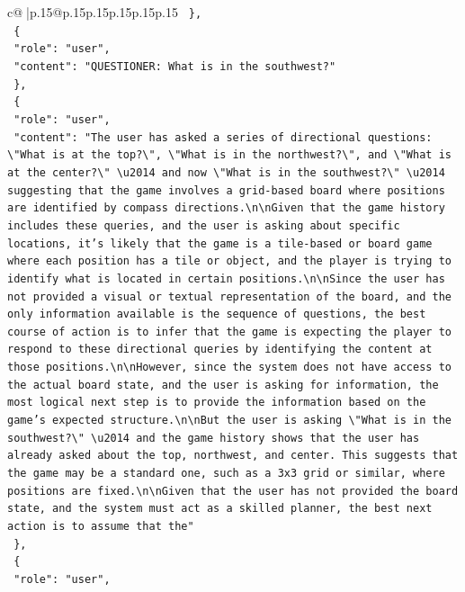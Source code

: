 \documentclass{article}
\begin{document}
{\begin{supertabular}{c@{$\;$}|p{.15\linewidth}@{}p{.15\linewidth}p{.15\linewidth}p{.15\linewidth}p{.15\linewidth}p{.15\linewidth}}
{{{\texttt{  \},} \\
\texttt{  \{} \\
\texttt{    "role": "user",} \\
\texttt{    "content": "QUESTIONER: What is in the southwest?"} \\
\texttt{  \},} \\
\texttt{  \{} \\
\texttt{    "role": "user",} \\
\texttt{    "content": "The user has asked a series of directional questions: \textbackslash{}"What is at the top?\textbackslash{}", \textbackslash{}"What is in the northwest?\textbackslash{}", and \textbackslash{}"What is at the center?\textbackslash{}" \textbackslash{}u2014 and now \textbackslash{}"What is in the southwest?\textbackslash{}" \textbackslash{}u2014 suggesting that the game involves a grid{-}based board where positions are identified by compass directions.\textbackslash{}n\textbackslash{}nGiven that the game history includes these queries, and the user is asking about specific locations, it's likely that the game is a tile{-}based or board game where each position has a tile or object, and the player is trying to identify what is located in certain positions.\textbackslash{}n\textbackslash{}nSince the user has not provided a visual or textual representation of the board, and the only information available is the sequence of questions, the best course of action is to infer that the game is expecting the player to respond to these directional queries by identifying the content at those positions.\textbackslash{}n\textbackslash{}nHowever, since the system does not have access to the actual board state, and the user is asking for information, the most logical next step is to provide the information based on the game's expected structure.\textbackslash{}n\textbackslash{}nBut the user is asking \textbackslash{}"What is in the southwest?\textbackslash{}" \textbackslash{}u2014 and the game history shows that the user has already asked about the top, northwest, and center. This suggests that the game may be a standard one, such as a 3x3 grid or similar, where positions are fixed.\textbackslash{}n\textbackslash{}nGiven that the user has not provided the board state, and the system must act as a skilled planner, the best next action is to assume that the"} \\
\texttt{  \},} \\
\texttt{  \{} \\
\texttt{    "role": "user",} \\
}}}
\end{supertabular}}
\end{document}
